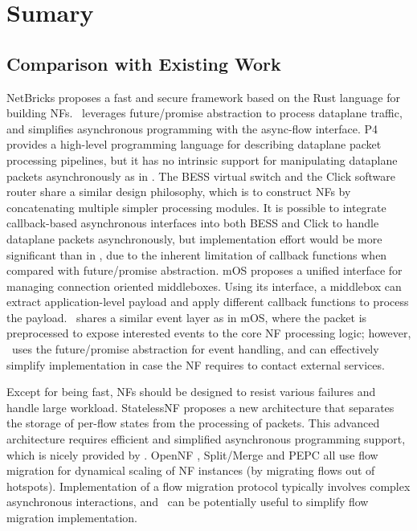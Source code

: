 \section{Sumary}
\label{sec:netstar-conclusion}

\subsection{Comparison with Existing Work} \label{sec:netstar-related-work}

NetBricks proposes a fast and secure framework based on the Rust \cite{199352} language for building NFs. %
\netstar~leverages future/promise abstraction to process dataplane traffic, and simplifies asynchronous programming with the async-flow interface.
P4 \cite{bosshart2014p4} provides a high-level programming language for describing dataplane packet processing pipelines, but it has no intrinsic support for manipulating dataplane packets asynchronously as in \netstar. The BESS virtual switch \cite{bess} and the Click software router \cite{kohler2000click} share a similar design philosophy, which is to construct NFs by concatenating multiple simpler processing modules. It is possible to integrate callback-based asynchronous interfaces into both BESS and Click to handle dataplane packets asynchronously, but implementation effort would be more significant than in \netstar, due to the inherent limitation of callback functions when compared with future/promise abstraction.
mOS \cite{201546} proposes a unified interface for managing connection oriented middleboxes. Using its interface, a middlebox can extract application-level payload and apply different callback functions to process the payload. \netstar~shares a similar event layer as in mOS, where the packet is preprocessed to expose interested events to the core NF processing logic; however, \netstar~uses the future/promise abstraction for event handling, and can effectively simplify implementation in case the NF requires to contact external services.

Except for being fast, NFs should be designed to resist various failures and handle large workload. %
StatelessNF \cite{201545} proposes a new architecture that separates the storage of per-flow states from the processing of packets. This advanced architecture requires efficient and simplified asynchronous programming support, which is nicely provided by \netstar. OpenNF \cite{gember2015opennf}, Split/Merge \cite{rajagopalan2013split} and PEPC \cite{Qazi:2017:HPP:3098822.3098848} all use flow migration for dynamical scaling of NF instances (by migrating flows out of hotspots). Implementation of a flow migration protocol typically involves complex asynchronous interactions, and \netstar~can be potentially useful to simplify flow migration implementation.

